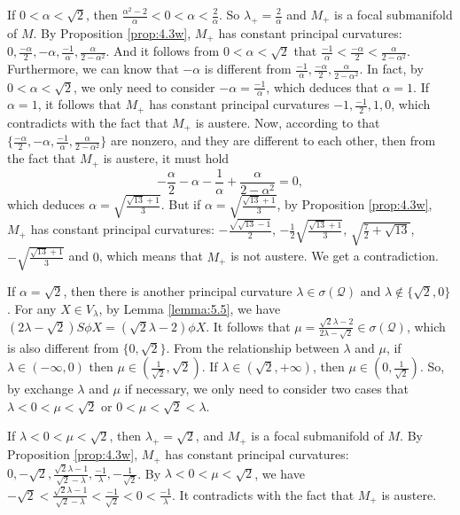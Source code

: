 \documentclass[reqno]{amsart}%
\theoremstyle{definition}
\numberwithin{equation}{section}
\begin{document}
If $0<\alpha<\sqrt{2}$, then $\frac{\alpha^2-2}{\alpha}<0<\alpha<\frac{2}{\alpha}$. So  $\lambda_+=\frac{2}{\alpha}$
and $M_+$ is a focal submanifold of $M$. By Proposition \ref{prop:4.3w}, $M_+$ has constant principal curvatures:
$0,\frac{-\alpha}{2},-\alpha,\frac{-1}{\alpha},\frac{\alpha}{2-\alpha^2}$. And it follows from
$0<\alpha<\sqrt{2}$ that $\frac{-1}{\alpha}<\frac{-\alpha}{2}<\frac{\alpha}{2-\alpha^2}$.
Furthermore, we can know that $-\alpha$ is different from $\frac{-1}{\alpha},\frac{-\alpha}{2},\frac{\alpha}{2-\alpha^2}$. In
fact, by $0<\alpha<\sqrt{2}$, we only need to consider $-\alpha=\frac{-1}{\alpha}$, which deduces that $\alpha=1$. If $\alpha=1$, it follows that $M_+$
has constant principal curvatures $-1,\frac{-1}{2},1,0$, which contradicts with the fact that $M_+$ is austere.
Now, according to that $\{\frac{-\alpha}{2},-\alpha,\frac{-1}{\alpha},\frac{\alpha}{2-\alpha^2}\}$ are
nonzero, and they are different to each other, then from the fact that $M_+$ is austere, it must hold
$$
-\frac{\alpha}{2}-\alpha-\frac{1}{\alpha}+\frac{\alpha}{2-\alpha^2}=0,
$$
which deduces $\alpha=\sqrt{\frac{\sqrt{13}+1}{3}}$. But if $\alpha=\sqrt{\frac{\sqrt{13}+1}{3}}$,
by Proposition \ref{prop:4.3w},
$M_+$ has constant principal curvatures:
$-\frac{\sqrt{\sqrt{13}-1}}{2}$, $-\frac{1}{2}\sqrt{\frac{\sqrt{13}+1}{3}}$, $\sqrt{\frac{7}{2}+\sqrt{13}}$, $-\sqrt{\frac{\sqrt{13}+1}{3}}$ and $0$,
which means that $M_+$ is not austere. We get a contradiction.




If $\alpha=\sqrt{2}$, then there is another principal curvature $\lambda\in\sigma(\mathcal{Q})$ and
$\lambda\notin\{\sqrt{2},0\}$. For any $X\in V_\lambda$, by Lemma \ref{lemma:5.5}, we have $(2\lambda-\sqrt{2})S\phi X=(\sqrt{2}\lambda-2)\phi X$. It follows that $\mu=\frac{\sqrt{2}\lambda-2}{2\lambda-\sqrt{2}}\in\sigma(\mathcal{Q})$, which
is also different from $\{0,\sqrt{2}\}$. From the relationship between $\lambda$ and
$\mu$, if $\lambda\in(-\infty,0)$ then $\mu\in(\frac{1}{\sqrt{2}},\sqrt{2})$.
If $\lambda\in(\sqrt{2},+\infty)$, then $\mu\in(0,\frac{1}{\sqrt{2}})$.
So, by exchange $\lambda$ and $\mu$ if necessary, we only need to consider two cases that
$\lambda<0<\mu<\sqrt{2}$ or $0<\mu<\sqrt{2}<\lambda$.

If $\lambda<0<\mu<\sqrt{2}$, then $\lambda_+=\sqrt{2}$, and $M_+$
is a focal submanifold of $M$. By Proposition \ref{prop:4.3w}, $M_+$ has constant principal curvatures:
$0,-\sqrt{2},\frac{\sqrt{2}\lambda-1}{\sqrt{2}-\lambda},\frac{-1}{\lambda},
-\frac{1}{\sqrt{2}}$. By $\lambda<0<\mu<\sqrt{2}$, we have $-\sqrt{2}<\frac{\sqrt{2}\lambda-1}{\sqrt{2}-\lambda}<\frac{-1}{\sqrt{2}}<0<\frac{-1}{\lambda}$.
It contradicts with the fact that $M_+$ is austere.
\end{document}
